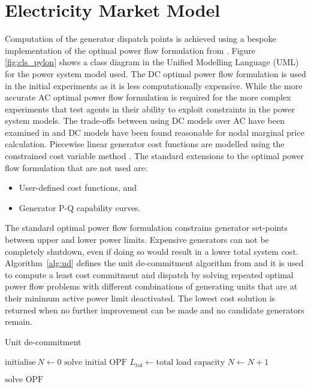 \section{Electricity Market Model}
Computation of the generator dispatch points is achieved using a bespoke
implementation of the optimal power flow formulation from
\matpower \cite[\S5]{pserc:mp_manual}.  Figure \ref{fig:cls_pylon} shows a
class diagram in the Unified Modelling Language (UML) for the power system
model used.  The DC optimal power flow formulation is used in the initial experiments
as it is less computationally expensive.  While the more accurate AC optimal
power flow formulation is required for the more complex experiments that test
agents in their ability to exploit constraints in the power system models.
The trade-offs between using DC models over AC have been examined in
 and DC models have been found reasonable for nodal
marginal price calculation.  Piecewise linear generator cost functions are
modelled using the constrained cost variable method \cite{zimmerman:ccv}.  The
standard extensions to the \matpower optimal power flow formulation that are
not used are:
\begin{itemize}
  \item User-defined cost functions, and
  \item Generator P-Q capability curves.
\end{itemize}

%

The standard optimal power flow formulation constrains generator set-points
between upper and lower power limits.  Expensive generators can not be
completely shutdown, even if doing so would result in a lower total system
cost.  Algorithm~\ref{alg:ud} defines the unit de-commitment algorithm from
 and it is used to compute a least cost commitment
and dispatch by solving repeated optimal power flow problems with different
combinations of generating units that are at their minimum active power limit
deactivated.  The lowest cost solution is returned when no further improvement
can be made and no candidate generators remain. \begin{algorithm}[H]
\caption{Unit de-commitment}
\label{alg:ud}
\begin{algorithmic}[1]
\STATE $\text{initialise}~N \leftarrow 0$
\STATE $\text{solve initial OPF}$
\STATE $L_{tot} \leftarrow \text{total load capacity}$
	\STATE $N \leftarrow N + 1$
\ENDWHILE

\REPEAT
		\STATE $\text{solve OPF}$
	\ENDFOR
{}
\end{algorithmic}
\end{algorithm}

